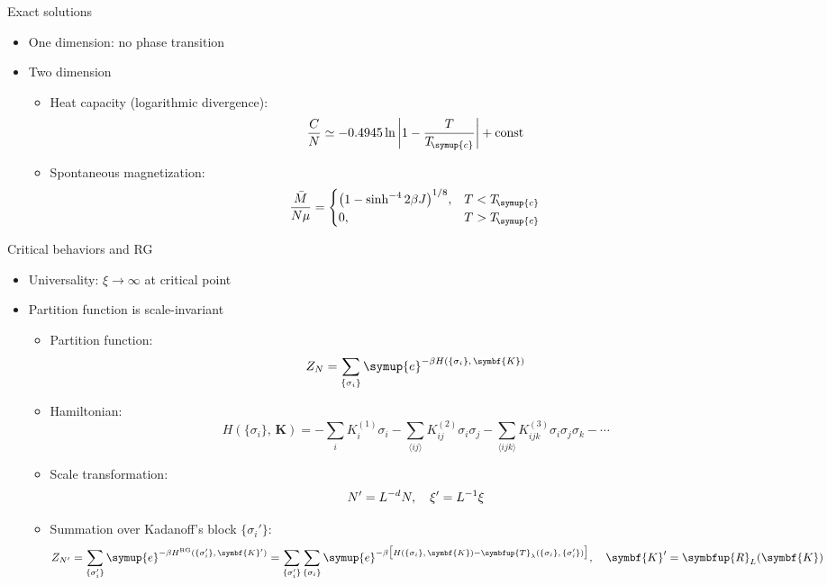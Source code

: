 \documentclass[aspectratio=169]{beamer}
\def\ee{{\symup{e}}}
\def\Tc{T_{\!\symup{c}}}
\def\opT{{\symbfup{T}}}
\def\opT{{\symbfup{T}}}
\newcommand\trR[2][]{\symbfup{R}^{\,#1}_{#2}}
\def\bm#1{{\symbf{#1}}}
\def\nearest#1{\langle#1\rangle}
\def\q#1{{\{#1\}}}
\def\const{\text{const}}
\begin{document}
\begin{frame}{Exact solutions}
\begin{itemize}
  \item One dimension: no phase transition
  \item Two dimension
    \begin{itemize}
      \item Heat capacity (logarithmic divergence):
        \[ \frac{C}{N} \simeq \num{-0.4945} \ln\abs{1-\frac{T}{\Tc}} + \const \]
      \item Spontaneous magnetization:
        \[
          \frac{\bar{M}}{N\mu} =
          \begin{cases}
            \qty(1 - \sinh^{-4} 2\beta J)^{1/8}, & T<\Tc \\
            0, & T>\Tc
          \end{cases}
        \]
    \end{itemize}
\end{itemize}
\end{frame}

\begin{frame}{Critical behaviors and RG}
\begin{itemize}
  \item Universality: $\xi\to\infty$ at critical point
  \item Partition function is scale-invariant
    \begin{itemize}
      \item Partition function:
        \[ Z_N = \sum_\q{\sigma_i} \ee^{-\beta H(\q{\sigma_i},\,\bm{K})} \]
      \item Hamiltonian:
        \[
            H(\q{\sigma_i},\,\bm{K})
          = - \sum_i K^{(1)}_i \sigma_i
            - \sum_{\nearest{ij}}  K^{(2)}_{ij}  \sigma_i\sigma_j
            - \sum_{\nearest{ijk}} K^{(3)}_{ijk} \sigma_i\sigma_j\sigma_k - \cdots
        \]
      \item Scale transformation:
        \[ N' = L^{-d} N \qc \xi' = L^{-1} \xi \]
      \item Summation over Kadanoff's block $\q{\sigma_i'}$:
        \[
          Z_{N'}
          = \sum_\q{\sigma'_i} \ee^{-\beta H^{\text{RG}}(\q{\sigma_i'},\,\bm{K}')}
          = \sum_\q{\sigma'_i} \sum_\q{\sigma_i}
            \ee^{-\beta \qty\big[H(\q{\sigma_i},\,\bm{K})
                 -\opT_\lambda(\q{\sigma_i},\,\q{\sigma_i'})]} \qc
          \bm{K}' = \trR{L}(\bm{K})
        \]
    \end{itemize}
\end{itemize}
\end{frame}
\end{document}
